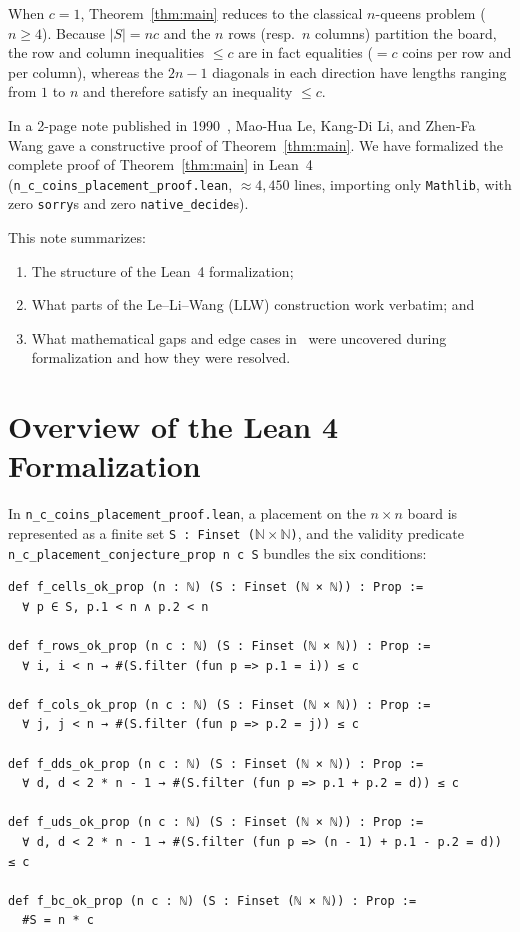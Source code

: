 \documentclass[11pt,a4paper]{article}
\theoremstyle{remark}
\begin{document}
When $c = 1$, Theorem~\ref{thm:main} reduces to the classical $n$-queens problem ($n \ge 4$). Because $|S| = nc$ and the $n$ rows (resp.\ $n$ columns) partition the board, the row and column inequalities $\le c$ are in fact equalities ($= c$ coins per row and per column), whereas the $2n - 1$ diagonals in each direction have lengths ranging from $1$ to $n$ and therefore satisfy an inequality $\le c$.

In a 2-page note published in 1990~\cite{LLW1990}, Mao-Hua Le, Kang-Di Li, and Zhen-Fa Wang gave a constructive proof of Theorem~\ref{thm:main}. We have formalized the complete proof of Theorem~\ref{thm:main} in Lean~4 (\texttt{n\_c\_coins\_placement\_proof.lean}, $\approx 4{,}450$ lines, importing only \texttt{Mathlib}, with zero \texttt{sorry}s and zero \texttt{native\_decide}s).

This note summarizes:
\begin{enumerate}[nosep]
  \item The structure of the Lean~4 formalization;
  \item What parts of the Le--Li--Wang (LLW) construction work verbatim; and
  \item What mathematical gaps and edge cases in~\cite{LLW1990} were uncovered during formalization and how they were resolved.
\end{enumerate}

\section{Overview of the Lean 4 Formalization}

In \texttt{n\_c\_coins\_placement\_proof.lean}, a placement on the $n \times n$ board is represented as a finite set \texttt{S : Finset ($\mathbb{N} \times \mathbb{N}$)}, and the validity predicate \texttt{n\_c\_placement\_conjecture\_prop n c S} bundles the six conditions:
\begin{lstlisting}[language=Lean4]
def f_cells_ok_prop (n : ℕ) (S : Finset (ℕ × ℕ)) : Prop :=
  ∀ p ∈ S, p.1 < n ∧ p.2 < n

def f_rows_ok_prop (n c : ℕ) (S : Finset (ℕ × ℕ)) : Prop :=
  ∀ i, i < n → #(S.filter (fun p => p.1 = i)) ≤ c

def f_cols_ok_prop (n c : ℕ) (S : Finset (ℕ × ℕ)) : Prop :=
  ∀ j, j < n → #(S.filter (fun p => p.2 = j)) ≤ c

def f_dds_ok_prop (n c : ℕ) (S : Finset (ℕ × ℕ)) : Prop :=
  ∀ d, d < 2 * n - 1 → #(S.filter (fun p => p.1 + p.2 = d)) ≤ c

def f_uds_ok_prop (n c : ℕ) (S : Finset (ℕ × ℕ)) : Prop :=
  ∀ d, d < 2 * n - 1 → #(S.filter (fun p => (n - 1) + p.1 - p.2 = d)) ≤ c

def f_bc_ok_prop (n c : ℕ) (S : Finset (ℕ × ℕ)) : Prop :=
  #S = n * c
\end{lstlisting}
\end{document}
